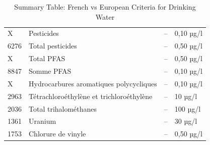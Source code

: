\documentclass{article}
\begin{document}
\begin{table}[H]
\begin{tabular}{|l|l|l|l|}
X & Pesticides & -- & 0,10 µg/l \\
6276 & Total pesticides & -- & 0,50 µg/l \\
X & Total PFAS & -- & 0,50 µg/l \\
8847 & Somme PFAS & -- & 0,10 µg/l \\
X & Hydrocarbures aromatiques polycycliques & -- & 0,10 µg/l \\
2963 & Tétrachloroéthylène et trichloroéthylène & -- & 10 µg/l \\
2036 & Total trihalométhanes & -- & 100 µg/l \\
1361 & Uranium & -- & 30 µg/l \\
1753 & Chlorure de vinyle & -- & 0,50 µg/l \\
\hline
\end{tabular}
\caption{Summary Table: French vs European Criteria for Drinking Water}
\end{table}
\end{document}
